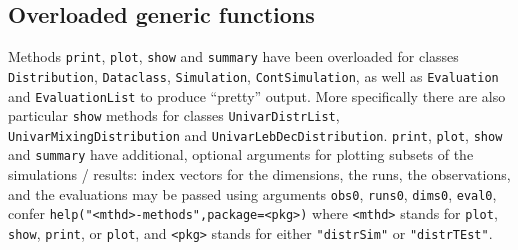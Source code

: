 \documentclass[11pt]{article}
\newcommand{\code}[1]{{\tt #1}}
\newcommand{\pkg}[1]{{\tt "#1"}}
\begin{document}
\subsection{Overloaded generic functions}
Methods \code{print}, \code{plot}, \code{show} and \code{summary} have been 
overloaded for classes \code{Distribution}, \code{Dataclass}, \code{Simulation}, 
\code{ContSimulation}, as well as \code{Evaluation} and \code{EvaluationList} to 
produce ``pretty''  output. 
More specifically there are also particular \code{show} methods
for classes \code{UnivarDistrList}, \code{UnivarMixingDistribution} and
\code{UnivarLebDecDistribution}.
\code{print}, \code{plot}, \code{show} and \code{summary} have additional, 
optional arguments for plotting subsets of the simulations / results:
index vectors for the dimensions, the runs, the observations, and the 
evaluations may be passed using arguments \code{obs0},  \code{runs0}, 
\code{dims0}, \code{eval0}, confer
\code{help("<mthd>-methods",package=<pkg>)} where \code{<mthd>} stands for 
\code{plot}, \code{show}, \code{print}, or \code{plot}, and \code{<pkg>} stands 
for either \pkg{distrSim} or \pkg{distrTEst}.
\end{document}
